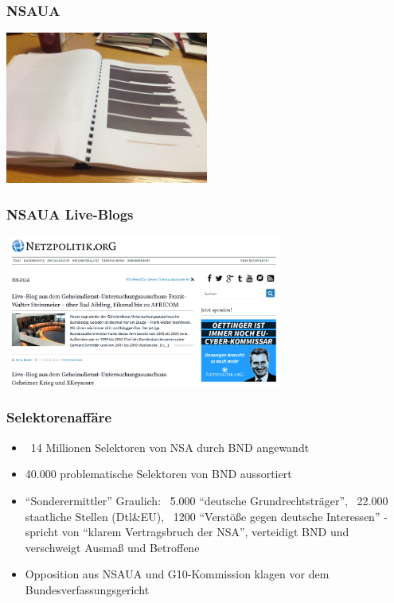 \documentclass[12pt, xcolor={svgnames,table}]{beamer}
\begin{document}
\begin{frame}
  \frametitle{NSAUA}
    \begin{center}
      \includegraphics[height=5cm]{img/nsa-ua-akte.jpg}
    \end{center}
\end{frame}

\begin{frame}
  \frametitle{NSAUA Live-Blogs}
    \begin{center}
      \includegraphics[height=5cm]{img/nsa-ua-netzpolitik.png}
    \end{center}
\end{frame}

\begin{frame}
  \frametitle{Selektorenaffäre}
    \small
    \begin{itemize}
      \item ~14 Millionen Selektoren von NSA durch BND angewandt
      \item 40.000 problematische Selektoren von BND aussortiert
      \item ``Sonderermittler'' Graulich: ~5.000 ``deutsche Grundrechtsträger'', ~22.000 staatliche Stellen (Dtl\&EU), ~1200 ``Verstöße gegen deutsche Interessen'' - spricht von ``klarem Vertragsbruch der NSA'', verteidigt BND und verschweigt Ausmaß und Betroffene
      \item Opposition aus NSAUA und G10-Kommission klagen vor dem Bundesverfassungsgericht
    \end{itemize}
\end{frame}
\end{document}
